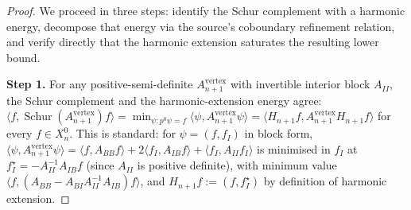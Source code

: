 \documentclass[11pt]{article}
\theoremstyle{plain}
\theoremstyle{definition}
\theoremstyle{remark}
\newcommand{\Schur}{\operatorname{Schur}}
\begin{document}
\begin{proof}
We proceed in three steps: identify the Schur complement with a
harmonic energy, decompose that energy via the source's coboundary
refinement relation, and verify directly that the harmonic
extension saturates the resulting lower bound.

\smallskip
\textbf{Step 1.}
For any positive-semi-definite $A_{n+1}^{\mathrm{vertex}}$ with
invertible interior block $A_{II}$, the Schur complement and the
harmonic-extension energy agree:
$\langle f, \Schur(A_{n+1}^{\mathrm{vertex}}) f\rangle =
\min_{\psi: p^{0}\psi = f}
\langle \psi, A_{n+1}^{\mathrm{vertex}} \psi\rangle =
\langle H_{n+1} f, A_{n+1}^{\mathrm{vertex}} H_{n+1} f\rangle$
for every $f \in X_n^{0}$. This is standard: for
$\psi = (f, f_I)$ in block form,
$\langle \psi, A_{n+1}^{\mathrm{vertex}} \psi\rangle =
\langle f, A_{BB} f\rangle + 2\langle f_I, A_{IB} f\rangle +
\langle f_I, A_{II} f_I\rangle$ is minimised in $f_I$ at
$f_I^{\star} = -A_{II}^{-1} A_{IB} f$ (since $A_{II}$ is positive
definite), with minimum value
$\langle f, (A_{BB} - A_{BI} A_{II}^{-1} A_{IB}) f\rangle$, and
$H_{n+1} f := (f, f_I^{\star})$ by definition of harmonic extension.


\end{proof}
\end{document}
